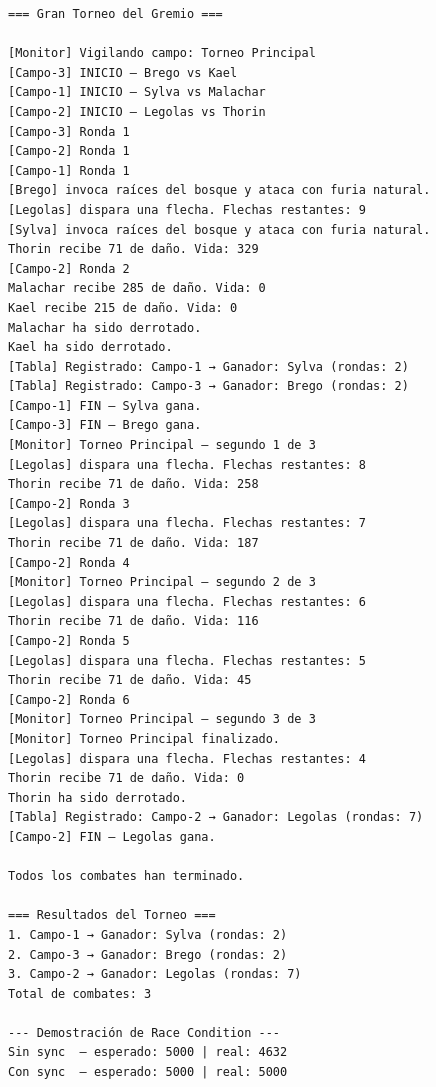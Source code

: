 \documentclass[11pt,letterpaper]{article}
\begin{document}
\begin{lstlisting}[style=TerminalStyle]
=== Gran Torneo del Gremio ===

[Monitor] Vigilando campo: Torneo Principal
[Campo-3] INICIO — Brego vs Kael
[Campo-1] INICIO — Sylva vs Malachar
[Campo-2] INICIO — Legolas vs Thorin
[Campo-3] Ronda 1
[Campo-2] Ronda 1
[Campo-1] Ronda 1
[Brego] invoca raíces del bosque y ataca con furia natural.
[Legolas] dispara una flecha. Flechas restantes: 9
[Sylva] invoca raíces del bosque y ataca con furia natural.
Thorin recibe 71 de daño. Vida: 329
[Campo-2] Ronda 2
Malachar recibe 285 de daño. Vida: 0
Kael recibe 215 de daño. Vida: 0
Malachar ha sido derrotado.
Kael ha sido derrotado.
[Tabla] Registrado: Campo-1 → Ganador: Sylva (rondas: 2)
[Tabla] Registrado: Campo-3 → Ganador: Brego (rondas: 2)
[Campo-1] FIN — Sylva gana.
[Campo-3] FIN — Brego gana.
[Monitor] Torneo Principal — segundo 1 de 3
[Legolas] dispara una flecha. Flechas restantes: 8
Thorin recibe 71 de daño. Vida: 258
[Campo-2] Ronda 3
[Legolas] dispara una flecha. Flechas restantes: 7
Thorin recibe 71 de daño. Vida: 187
[Campo-2] Ronda 4
[Monitor] Torneo Principal — segundo 2 de 3
[Legolas] dispara una flecha. Flechas restantes: 6
Thorin recibe 71 de daño. Vida: 116
[Campo-2] Ronda 5
[Legolas] dispara una flecha. Flechas restantes: 5
Thorin recibe 71 de daño. Vida: 45
[Campo-2] Ronda 6
[Monitor] Torneo Principal — segundo 3 de 3
[Monitor] Torneo Principal finalizado.
[Legolas] dispara una flecha. Flechas restantes: 4
Thorin recibe 71 de daño. Vida: 0
Thorin ha sido derrotado.
[Tabla] Registrado: Campo-2 → Ganador: Legolas (rondas: 7)
[Campo-2] FIN — Legolas gana.

Todos los combates han terminado.

=== Resultados del Torneo ===
1. Campo-1 → Ganador: Sylva (rondas: 2)
2. Campo-3 → Ganador: Brego (rondas: 2)
3. Campo-2 → Ganador: Legolas (rondas: 7)
Total de combates: 3

--- Demostración de Race Condition ---
Sin sync  — esperado: 5000 | real: 4632
Con sync  — esperado: 5000 | real: 5000
\end{lstlisting}
\end{document}
